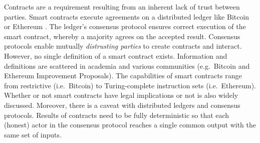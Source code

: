 Contracts are a requirement resulting from an inherent lack of trust between parties.
Smart contracts execute agreements on a distributed ledger like Bitcoin or Ethereum \cite{Nakamoto2008,Buterin2013}.
The ledger's consensus protocol ensures correct execution of the smart contract, whereby a majority agrees on the accepted result.
Consensus protocols enable mutually \emph{distrusting parties} to create contracts and interact.
However, no single definition of a smart contract exists.
Information and definitions are scattered in academia and various communities (e.g.\ Bitcoin and Ethereum Improvement Proposals).
The capabilities of smart contracts range from restrictive (i.e.\ Bitcoin) to Turing-complete instruction sets (i.e.\ Ethereum). 
Whether or not smart contracts have legal implications or not is also widely discussed.
Moreover, there is a caveat with distributed ledgers and consensus protocols.
Results of contracts need to be fully deterministic so that each (honest) actor in the consensus protocol reaches a single common output with the same set of inputs.


